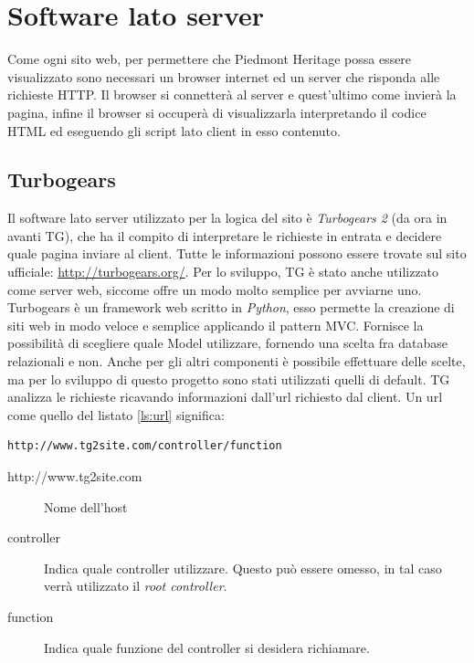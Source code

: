 \section{Software lato server}
Come ogni sito web, per permettere che Piedmont Heritage possa essere visualizzato sono necessari un browser internet ed un server che risponda alle richieste HTTP. Il browser si connetterà al server e quest'ultimo come invierà la pagina, infine il browser si occuperà di visualizzarla interpretando il codice HTML ed eseguendo gli script lato client in esso contenuto.
\subsection{Turbogears}
Il software lato server utilizzato per la logica del sito è \emph{Turbogears 2} (da ora in avanti TG), che ha il compito di interpretare le richieste in entrata e decidere quale pagina inviare al client. Tutte le informazioni possono essere trovate sul sito ufficiale: \url{http://turbogears.org/}.
Per lo sviluppo, TG è stato anche utilizzato come server web, siccome offre un modo molto semplice per avviarne uno.
Turbogears è un framework web scritto in \emph{Python}, esso permette la creazione di siti web in modo veloce e semplice applicando il pattern MVC. Fornisce la possibilità di scegliere quale Model utilizzare, fornendo una scelta fra database relazionali e non. Anche per gli altri componenti è possibile effettuare delle scelte, ma per lo sviluppo di questo progetto sono stati utilizzati quelli di default.
TG analizza le richieste ricavando informazioni dall'url richiesto dal client. Un url come quello del listato \ref{ls:url} significa:
\begin{lstlisting}[label=ls:url,caption={Url per la richiesta di una pagina}]
http://www.tg2site.com/controller/function
\end{lstlisting}
		
\begin{description}
\item[http://www.tg2site.com] 
		
Nome dell'host
\item[controller]
		
Indica quale controller utilizzare. Questo pu\`o essere omesso, in tal caso verr\`a utilizzato il \emph{root controller}.
\item[function]
		
Indica quale funzione del controller si desidera richiamare.
\end{description}

